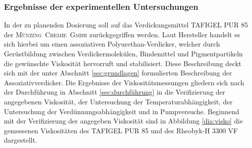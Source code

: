 %

\subsubsection{Ergebnisse der experimentellen Untersuchungen}
\label{sec:analyse}
In der zu planenden Dosierung soll auf das Verdickungsmittel TAFIGEL PUR 85 der \mbox{\textsc{Münzing Chemie Gmbh}} zurückgegriffen werden. Laut Hersteller handelt es sich hierbei um einen assoziativen Polyurethan-Verdicker, welcher durch Gerüstbildung zwischen Verdickermolekülen, Bindemittel und Pigmentpartikeln die gewünschte Viskosität hervorruft und stabilisiert. Diese Beschreibung deckt sich mit der unter Abschnitt \ref{sec:grundlagen} formulierten Beschreibung der Assoziativverdicker. \cite{MunzingChemieGmbH.2014}
Die Ergebnisse der Viskositätsmessungen gliedern sich nach der Durchführung in Abschnitt \ref{sec:durchführung} in die Verifizierung der angegebenen Viskosität, der Untersuchung der Temperaturabhängigkeit, der Untersuchung der Verdünnungsabhängigkeit und in Pumpversuche.
Beginnend mit der Verifizierung der angegeben Viskosität sind in Abbildung \ref{dia:visko} die gemessenen Viskositäten des TAFIGEL PUR 85 und des Rheobyk-H 3300 VF dargestellt. 


